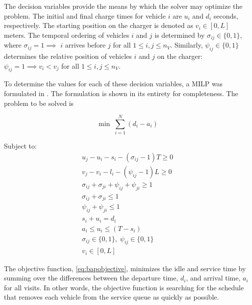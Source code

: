 \documentclass[ee,thesis]{usuthesis}
\begin{document}
The decision variables provide the means by which the solver may optimize the problem. The initial and final charge
times for vehicle \(i\) are \(u_i\) and \(d_i\) seconds, respectively. The starting position on the charger is denoted as \(v_i
\in [0,L]\) meters. The temporal ordering of vehicles \(i\) and \(j\) is determined by \(\sigma_{ij} \in \{0, 1\}\), where \(\sigma_{ij} = 1
\implies\) \(i\) arrives before \(j\) for all \(1 \le i,j \le n_V\). Similarly, \(\psi_{ij} \in \{0, 1\}\) determines the relative
position of vehicles \(i\) and \(j\) on the charger: \(\psi_{ij} = 1 \implies v_i < v_j\) for all \(1 \le i,j \le n_V\).

To determine the values for each of these decision variables, a MILP was formulated in
\cite{qarebagh-2019-optim-sched}. The formulation is shown in its entirety for completeness.
The problem to be solved is

\begin{equation}
	\label{eq:bapobjective}
	\min\; \sum_{i=1}^N (d_i - a_i)
\end{equation}

Subject to:
\begin{subequations}
\label{eq:bapconstrs}
\begin{align}
    u_j - u_i - s_i - (\sigma_{ij} - 1)T \geq 0   \label{subeq:baptime}          \\
    v_j - v_i - l_i - (\psi_{ij} - 1)L \geq 0   \label{subeq:bapspace}           \\
    \sigma_{ij} + \sigma_{ji} + \psi_{ij} + \psi_{ji} \geq 1 \label{subeq:bapvalid_pos}     \\
    \sigma_{ij} + \sigma_{ji} \leq 1                   \label{subeq:bapsigma}        \\
    \psi_{ij} + \psi_{ji} \leq 1                   \label{subeq:bapdelta}        \\
    s_i + u_i = d_i                       \label{subeq:bapdetach}       \\
    a_i \leq u_i \leq (T - s_i)                 \label{subeq:bapvalid_starts} \\
    \sigma_{ij} \in \{0,1\},\;\psi_{ij} \in \{0,1\}\; \label{subeq:bapsdspace}      \\
    v_i \in [0, L ]                         \label{subeq:bapvspace}
\end{align}
\end{subequations}

\noindent The objective function, \autoref{eq:bapobjective}, minimizes the idle and service time by summing over the
differences between the departure time, \(d_i\), and arrival time, \(a_i\) for all visits. In other words, the objective
function is searching for the schedule that removes each vehicle from the service queue as quickly as possible.
\end{document}
